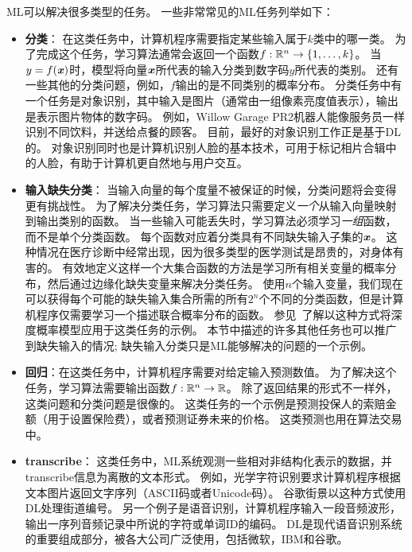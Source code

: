 \gls{ML}可以解决很多类型的任务。
一些非常常见的\gls{ML}任务列举如下：
\begin{itemize}
    \item \textbf{分类}：
    在这类任务中，计算机程序需要指定某些输入属于$k$类中的哪一类。
    为了完成这个任务，学习算法通常会返回一个函数$f:\mathbb{R}^n \to \{1,\dots,k\}$。
    当$y=f(\boldsymbol{\mathit{x}})$时，模型将向量$\boldsymbol{\mathit{x}}$所代表的输入分类到数字码$y$所代表的类别。
    还有一些其他的分类问题，例如，$f$输出的是不同类别的概率分布。
    分类任务中有一个任务是对象识别，其中输入是图片（通常由一组像素亮度值表示），输出是表示图片物体的数字码。
    例如，Willow Garage PR2机器人能像服务员一样识别不同饮料，并送给点餐的顾客\citep{Goodfellow2010}。
    目前，最好的对象识别工作正是基于\gls{DL}的\citep{Krizhevsky-2012-small,Ioffe+Szegedy-2015}。
    对象识别同时也是计算机识别人脸的基本技术，可用于标记相片合辑中的人脸\citep{Taigman-et-al-CVPR2014}，有助于计算机更自然地与用户交互。
    
    \item \textbf{输入缺失分类}：
    当输入向量的每个度量不被保证的时候，分类问题将会变得更有挑战性。
    为了解决分类任务，学习算法只需要定义\emph{一个}从输入向量映射到输出类别的函数。
    当一些输入可能丢失时，学习算法必须学习\emph{一组}函数，而不是单个分类函数。
    每个函数对应着分类具有不同缺失输入子集的$\boldsymbol{\mathit{x}}$。
    这种情况在医疗诊断中经常出现，因为很多类型的医学测试是昂贵的，对身体有害的。
    有效地定义这样一个大集合函数的方法是学习所有相关变量的概率分布，然后通过边缘化缺失变量来解决分类任务。 
    使用$n$个输入变量，我们现在可以获得每个可能的缺失输入集合所需的所有$2^n$个不同的分类函数，但是计算机程序仅需要学习一个描述联合概率分布的函数。
    参见~\cite{Goodfellow-et-al-NIPS2013}了解以这种方式将深度概率模型应用于这类任务的示例。 
    本节中描述的许多其他任务也可以推广到缺失输入的情况; 缺失输入分类只是\gls{ML}能够解决的问题的一个示例。
    

    \item \textbf{回归}：在这类任务中，计算机程序需要对给定输入预测数值。
    为了解决这个任务，学习算法需要输出函数$f:\mathbb{R}^n \to \mathbb{R}$。
    除了返回结果的形式不一样外，这类问题和分类问题是很像的。
    这类任务的一个示例是预测投保人的索赔金额（用于设置保险费），或者预测证券未来的价格。
    这类预测也用在算法交易中。
    
    \item \textbf{\gls{transcribe}}：
    这类任务中，\gls{ML}系统观测一些相对非结构化表示的数据，并\gls{transcribe}信息为离散的文本形式。
    例如，光学字符识别要求计算机程序根据文本图片返回文字序列（ASCII码或者Unicode码）。
    谷歌街景以这种方式使用\gls{DL}处理街道编号\citep{Goodfellow+et+al-ICLR2014a}。
    另一个例子是语音识别，计算机程序输入一段音频波形，输出一序列音频记录中所说的字符或单词ID的编码。
    \gls{DL}是现代语音识别系统的重要组成部分，被各大公司广泛使用，包括微软，IBM和谷歌\citep{Hinton-et-al-2012}。


\end{itemize}
